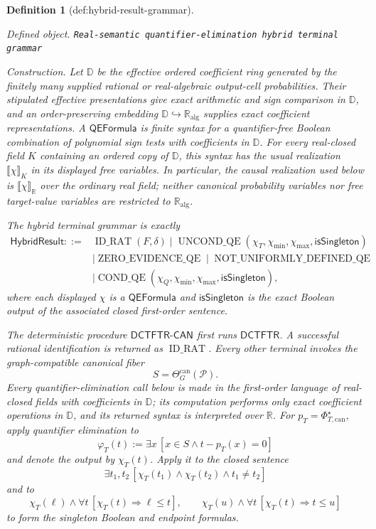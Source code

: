 \documentclass{article}
\newtheorem{definition}{Definition}
\begin{document}
\begin{definition}[def:hybrid-result-grammar]\label{def:hybrid-result-grammar}
\par\smallskip\noindent\emph{Defined object.} \texttt{Real-\allowbreak{}semantic quantifier-\allowbreak{}elimination hybrid terminal grammar}
\par\smallskip\noindent\emph{Construction.} Let \(\mathbb D\) be the effective ordered coefficient ring generated by the finitely many supplied rational or real-algebraic output-cell probabilities.  Their stipulated effective presentations give exact arithmetic and sign comparison in \(\mathbb D\), and an order-preserving embedding \(\mathbb D\hookrightarrow\mathbb R_{\mathrm{alg}}\) supplies exact coefficient representations.  A \(\mathsf{QEFormula}\) is finite syntax for a quantifier-free Boolean combination of polynomial sign tests with coefficients in \(\mathbb D\).  For every real-closed field \(K\) containing an ordered copy of \(\mathbb D\), this syntax has the usual realization \(\llbracket\chi\rrbracket_K\) in its displayed free variables.  In particular, the causal realization used below is \(\llbracket\chi\rrbracket_{\mathbb R}\) over the ordinary real field; neither canonical probability variables nor free target-value variables are restricted to \(\mathbb R_{\mathrm{alg}}\).

The hybrid terminal grammar is exactly
\[
\begin{split}
\mathsf{HybridResult}::={}&
\operatorname{ID\_RAT}(F,\delta)
\mid\operatorname{UNCOND\_QE}(\chi_T,\chi_{\min},\chi_{\max},\mathsf{isSingleton})\\
&\mid\operatorname{ZERO\_EVIDENCE\_QE}
\mid\operatorname{NOT\_UNIFORMLY\_DEFINED\_QE}\\
&\mid\operatorname{COND\_QE}(\chi_Q,\chi_{\min},\chi_{\max},\mathsf{isSingleton}),
\end{split}
\tag{1}
\]
where each displayed \(\chi\) is a \(\mathsf{QEFormula}\) and \(\mathsf{isSingleton}\) is the exact Boolean output of the associated closed first-order sentence.

The deterministic procedure \(\mathsf{DCTFTR\text{-}CAN}\) first runs \(\mathsf{DCTFTR}\).  A successful rational identification is returned as \(\operatorname{ID\_RAT}\).  Every other terminal invokes the graph-compatible canonical fiber
\[
S=\Theta_G^{\mathrm{can}}(\mathcal P).
\]
Every quantifier-elimination call below is made in the first-order language of real-closed fields with coefficients in \(\mathbb D\); its computation performs only exact coefficient operations in \(\mathbb D\), and its returned syntax is interpreted over \(\mathbb R\).  For \(p_T=\Phi_{T,\mathrm{can}}^\star\), apply quantifier elimination to
\[
\varphi_T(t):=\exists x\,[x\in S\wedge t-p_T(x)=0]
\tag{2}
\]
and denote the output by \(\chi_T(t)\).  Apply it to the closed sentence
\[
\exists t_1,t_2\,[\chi_T(t_1)\wedge\chi_T(t_2)\wedge t_1\ne t_2]
\tag{3}
\]
and to
\[
\chi_T(\ell)\wedge\forall t\,[\chi_T(t)\Longrightarrow\ell\leq t],
\qquad
\chi_T(u)\wedge\forall t\,[\chi_T(t)\Longrightarrow t\leq u]
\tag{4}
\]
to form the singleton Boolean and endpoint formulas.


\end{definition}
\end{document}
